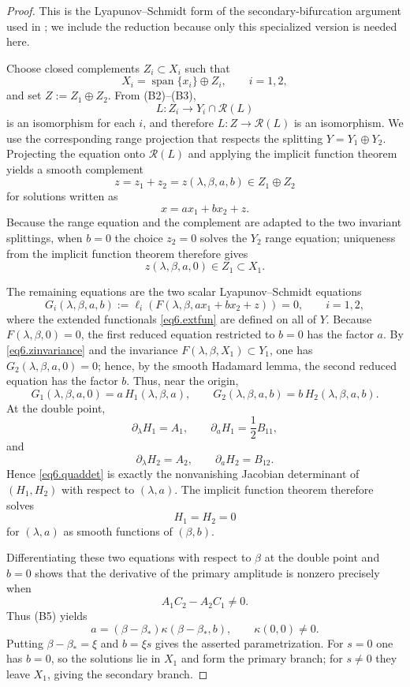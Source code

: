 \documentclass[12pt]{article}
\numberwithin{equation}{section}
\numberwithin{equation}{section}
\begin{document}
\begin{proof}
This is the Lyapunov--Schmidt form of the secondary-bifurcation argument used in
\cite{Shearer}; we include the reduction because only this specialized version is
needed here.

Choose closed complements $Z_i\subset X_i$ such that
\[
X_i=\operatorname{span}\{x_i\}\oplus Z_i,
\qquad i=1,2,
\]
and set $Z:=Z_1\oplus Z_2$.  From (B2)--(B3),
\[
L:Z_i\longrightarrow Y_i\cap\mathcal R(L)
\]
is an isomorphism for each $i$, and therefore
$L:Z\to\mathcal R(L)$ is an isomorphism.  We use the corresponding range projection
that respects the splitting $Y=Y_1\oplus Y_2$.  Projecting the equation onto
$\mathcal R(L)$ and applying the implicit function theorem yields a smooth complement
\[
z=z_1+z_2=z(\lambda,\beta,a,b)\in Z_1\oplus Z_2
\]
for solutions written as
\[
x=ax_1+bx_2+z.
\]
Because the range equation and the complement are adapted to the two invariant
splittings, when $b=0$ the choice $z_2=0$ solves the $Y_2$ range equation; uniqueness
from the implicit function theorem therefore gives
\begin{equation}\label{eq6.zinvariance}
z(\lambda,\beta,a,0)\in Z_1\subset X_1.
\end{equation}

The remaining equations are the two scalar Lyapunov--Schmidt equations
\[
G_i(\lambda,\beta,a,b)
:=
\ell_i\!\left(F(\lambda,\beta,ax_1+bx_2+z)\right)=0,
\qquad i=1,2,
\]
where the extended functionals \eqref{eq6.extfun} are defined on all of $Y$.
Because $F(\lambda,\beta,0)=0$, the first reduced equation restricted to $b=0$
has the factor $a$.  By \eqref{eq6.zinvariance} and the invariance
$F(\lambda,\beta,X_1)\subset Y_1$, one has
$G_2(\lambda,\beta,a,0)=0$; hence, by the smooth Hadamard lemma, the second reduced
equation has the factor $b$.  Thus, near the origin,
\[
G_1(\lambda,\beta,a,0)=a\,H_1(\lambda,\beta,a),
\qquad
G_2(\lambda,\beta,a,b)=b\,H_2(\lambda,\beta,a,b).
\]
At the double point,
\[
\partial_\lambda H_1=A_1,\qquad
\partial_aH_1=\frac12B_{11},
\]
and
\[
\partial_\lambda H_2=A_2,\qquad
\partial_aH_2=B_{12}.
\]
Hence \eqref{eq6.quaddet} is exactly the nonvanishing Jacobian determinant of
$(H_1,H_2)$ with respect to $(\lambda,a)$.  The implicit function theorem therefore
solves
\[
H_1=H_2=0
\]
for $(\lambda,a)$ as smooth functions of $(\beta,b)$.

Differentiating these two equations with respect to $\beta$ at the double point and
$b=0$ shows that the derivative of the primary amplitude is nonzero precisely when
\[
A_1C_2-A_2C_1\neq0.
\]
Thus (B5) yields
\[
a=(\beta-\beta_*)\kappa(\beta-\beta_*,b),
\qquad \kappa(0,0)\neq0.
\]
Putting $\beta-\beta_*=\xi$ and $b=\xi s$ gives the asserted parametrization.
For $s=0$ one has $b=0$, so the solutions lie in $X_1$ and form the primary branch;
for $s\neq0$ they leave $X_1$, giving the secondary branch.
\end{proof}
\end{document}
